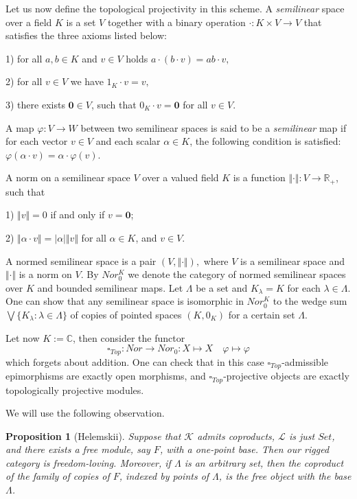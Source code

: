 \documentclass[a0b,landscape]{a0poster}
\newtheorem*{proposition}{Proposition}
\begin{document}
\begin{multicols}{4}
Let us now define the topological projectivity in this scheme. A \textit{semilinear} space over a field $K$ is a set $V$ together with a binary operation
$\cdot:K\times V\to V$ that satisfies the three axioms listed below:

1) for all $a,b\in K$ and $v\in V$ holds $a\cdot (b\cdot v) = ab\cdot v,$

2) for all $v\in V$ we have $1_K\cdot v=v,$

3) there exists $\mathbf{0} \in V$, such that $0_K\cdot v = \mathbf{0}$ for all $v \in V$.

A map $\varphi : V \to W$  between two semilinear spaces is said to be a \textit{semilinear} map if for each vector $v \in V$ and each scalar $\alpha\in K$,
the following condition is satisfied:  $\varphi(\alpha \cdot v) = \alpha \cdot \varphi(v)$.

A norm on a semilinear space $V$ over a valued field $K$ is a function $ \Vert  \cdot  \Vert  : V \to \mathbb{R}_{+}$, such that

1) $ \Vert  v  \Vert  = 0$ if and only if $v = \mathbf{0}$;

2) $ \Vert  \alpha \cdot v  \Vert  = | \alpha |  \Vert  v  \Vert $ for all $\alpha \in K$, and $v \in V$.

A normed semilinear space is a pair $(V,  \Vert  \cdot  \Vert  ),$ where $V$ is a semilinear space and $  \Vert  \cdot  \Vert  $ is a norm on $V$. By $Nor_0^K$ we denote the 
category of normed semilinear spaces over $K$ and bounded semilinear maps.  Let $\Lambda$ be a set and $K_{\lambda}=K$ for each $\lambda \in \Lambda$. One can show that any semilinear space is isomorphic in $Nor_0^K$ to the wedge sum 
$\bigvee\{K_{\lambda}: \lambda \in\Lambda\}$ of copies of pointed spaces $(K,0_K)$ for a certain set $\Lambda$.

Let now $K := \mathbb{C}$, then consider the functor
$$
\square_{Top}:Nor\to Nor_0: X\mapsto X\quad \varphi\mapsto \varphi
$$
which forgets about addition. One can check that in this case $\square_{Top}$-admissible epimorphisms
are exactly open morphisms, and $\square_{Top}$-projective objects are exactly topologically projective modules.

We will use the following observation.

\begin{proposition}[Helemskii] Suppose that $\mathcal{K}$ admits coproducts, $\mathcal{L}$ is just $Set$, and there
exists a free module, say $F$, with a one-point base. Then our rigged category is freedom-loving. Moreover, if $\Lambda$ is an arbitrary set, then the coproduct of the family
of copies of $F$, indexed by points of $\Lambda$, is the free object with the base $\Lambda$.
\end{proposition}


\end{multicols}
\end{document}
